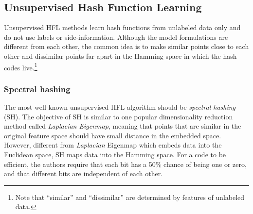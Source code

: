 \subsection{Unsupervised Hash Function Learning}
Unsupervised \mbox{HFL} methods learn hash functions from unlabeled data only and do not use labels or side-information. Although the model formulations are different from each other, the common idea is to make similar points close to each other and dissimilar points far apart in the Hamming space in which the hash codes live.\footnote{Note that ``similar'' and ``dissimilar'' are determined by features of unlabeled data.}

\subsubsection{Spectral hashing}
The most well-known unsupervised \mbox{HFL} algorithm should be \textit{spectral hashing} (\mbox{SH}). The objective of \mbox{SH} is similar to one popular dimensionality reduction method called \textit{Laplacian Eigenmap}, meaning that points that are similar in the original feature space should have small distance in the embedded space. However, different from \textit{Laplacian} Eigenmap which embeds data into the Euclidean space, \mbox{SH} maps data into the Hamming space. For a code to be efficient, the authors require that each bit has a 50\% chance of being one or zero, and that different bits are independent of each other. 

